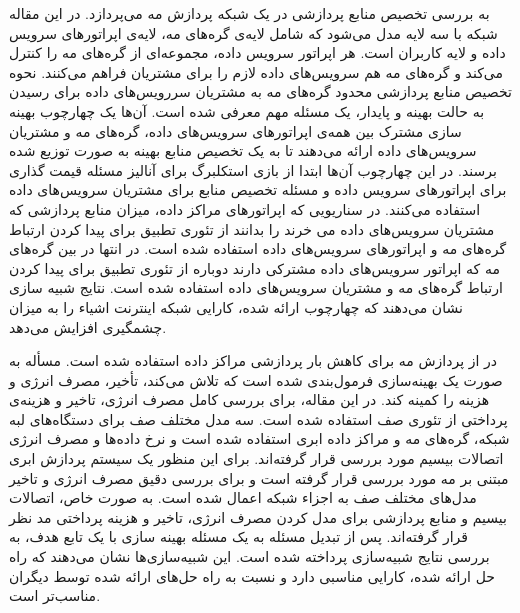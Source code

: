     \cite{zhang2017computing} به بررسی تخصیص منابع پردازشی در یک شبکه پردازش مه می‌پردازد.
    در این مقاله شبکه با سه لایه مدل می‌شود که شامل لایه‌ی گره‌های مه، لایه‌ی اپراتور‌های سرویس داده و لایه کاربران است.
    هر اپراتور سرویس داده، مجموعه‌ای از گره‌های مه را کنترل می‌کند و گره‌های مه هم سرویس‌های داده لازم را برای مشتریان فراهم می‌کنند.
    نحوه تخصیص منابع پردازشی محدود گره‌های مه به مشتریان سررویس‌های داده برای رسیدن به حالت بهینه و پایدار، یک مسئله مهم معرفی شده است.
    آن‌ها یک چهارچوب بهینه سازی مشترک بین همه‌ی اپراتور‌های سرویس‌های داده، گره‌های مه و مشتریان سرویس‌های داده ارائه می‌دهند تا به یک تخصیص منابع بهینه به صورت توزیع شده برسند.
    در این چهارچوب آن‌‌ها ابتدا از بازی استکلبرگ برای آنالیز مسئله قیمت گذاری برای اپراتور‌های سرویس داده و مسئله تخصیص منابع برای مشتریان سرویس‌های داده استفاده می‌کنند.
    در سناریویی که اپراتور‌های مراکز داده، میزان منابع پردازشی که مشتریان سرویس‌های داده می خرند را بدانند از تئوری تطبیق برای پیدا کردن ارتباط گره‌های مه و اپراتور‌های سرویس‌های داده استفاده شده است.
    در انتها در بین گره‌های مه که اپراتور سرویس‌های داده مشترکی دارند دوباره از تئوری تطبیق برای پیدا کردن ارتباط گره‌های مه و مشتریان سرویس‌های داده استفاده شده است.
    نتایج شبیه سازی نشان می‌دهند که چهارچوب ارائه شده، کارایی شبکه اینترنت اشیاء را به میزان چشمگیری افزایش می‌دهد.


    
    در \cite{liu2017multiobjective} از پردازش مه برای کاهش بار پردازشی مراکز داده استفاده شده است.
    مسأله به صورت یک بهینه‌سازی فرمول‌بندی شده است که تلاش می‌کند، تأخیر، مصرف انرژی و هزینه را کمینه کند.
    در این مقاله، برای بررسی کامل مصرف انرژی، تاخیر و هزینه‌ی پرداختی از تئوری صف استفاده شده است.
    سه مدل مختلف صف برای دستگاه‌های لبه شبکه، گره‌های مه و مراکز داده ابری استفاده شده است و نرخ داده‌ها و مصرف انرژی اتصالات بیسیم مورد بررسی قرار گرفته‌اند.
    برای این منظور یک سیستم پردازش ابری مبتنی بر مه مورد بررسی قرار گرفته است و برای بررسی دقیق مصرف انرژی و تاخیر مدل‌های مختلف صف به اجزاء شبکه اعمال شده است.
    به صورت خاص، اتصالات بیسیم و منابع پردازشی برای مدل کردن مصرف انرژی، تاخیر و هزینه پرداختی مد نظر قرار گرفته‌اند.
    پس از تبدیل مسئله به یک مسئله بهینه سازی با یک تابع هدف، به بررسی نتایج شبیه‌سازی پرداخته شده است.
    این شبیه‌سازی‌ها نشان می‌دهند که راه حل ارائه شده، کارایی مناسبی دارد و نسبت به راه حل‌های ارائه شده توسط دیگران مناسب‌تر است.


